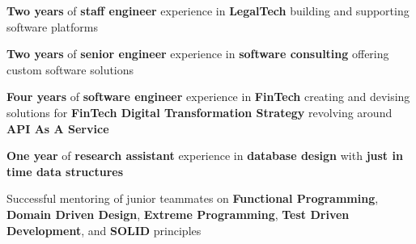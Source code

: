 

\begin{cvparagraph}

\begin{cvitems}
    \item{\textbf{Two years} of \textbf{staff engineer} experience in \textbf{LegalTech} building and supporting software platforms}
    \item{\textbf{Two years} of \textbf{senior engineer} experience in \textbf{software consulting} offering custom software solutions}
    \item{\textbf{Four years} of \textbf{software engineer} experience in \textbf{FinTech} creating and devising solutions for \textbf{FinTech Digital Transformation Strategy} revolving around \textbf{API As A Service}}
    \item{\textbf{One year} of \textbf{research assistant} experience in \textbf{database design} with \textbf{just in time data structures}}
    \item{Successful mentoring of junior teammates on \textbf{Functional Programming}, \textbf{Domain Driven Design}, \textbf{Extreme Programming}, \textbf{Test Driven Development}}, and \textbf{SOLID} principles
\end{cvitems}
\end{cvparagraph}
